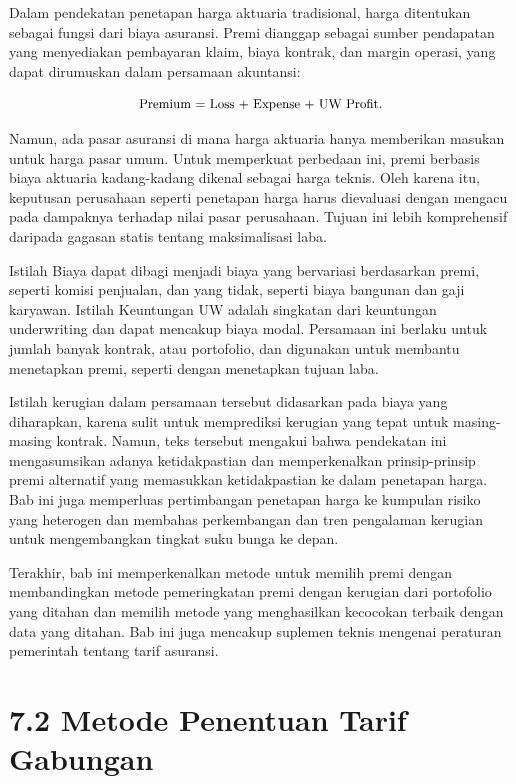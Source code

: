 \documentclass[
]{book}
\begin{document}
Dalam pendekatan penetapan harga aktuaria tradisional, harga ditentukan sebagai fungsi dari biaya asuransi. Premi dianggap sebagai sumber pendapatan yang menyediakan pembayaran klaim, biaya kontrak, dan margin operasi, yang dapat dirumuskan dalam persamaan akuntansi:

\begin{equation}
\small{
\text{Premium = Loss + Expense + UW Profit} .
}
\end{equation}

Namun, ada pasar asuransi di mana harga aktuaria hanya memberikan masukan untuk harga pasar umum. Untuk memperkuat perbedaan ini, premi berbasis biaya aktuaria kadang-kadang dikenal sebagai harga teknis. Oleh karena itu, keputusan perusahaan seperti penetapan harga harus dievaluasi dengan mengacu pada dampaknya terhadap nilai pasar perusahaan. Tujuan ini lebih komprehensif daripada gagasan statis tentang maksimalisasi laba.

Istilah Biaya dapat dibagi menjadi biaya yang bervariasi berdasarkan premi, seperti komisi penjualan, dan yang tidak, seperti biaya bangunan dan gaji karyawan. Istilah Keuntungan UW adalah singkatan dari keuntungan underwriting dan dapat mencakup biaya modal. Persamaan ini berlaku untuk jumlah banyak kontrak, atau portofolio, dan digunakan untuk membantu menetapkan premi, seperti dengan menetapkan tujuan laba.

Istilah kerugian dalam persamaan tersebut didasarkan pada biaya yang diharapkan, karena sulit untuk memprediksi kerugian yang tepat untuk masing-masing kontrak. Namun, teks tersebut mengakui bahwa pendekatan ini mengasumsikan adanya ketidakpastian dan memperkenalkan prinsip-prinsip premi alternatif yang memasukkan ketidakpastian ke dalam penetapan harga. Bab ini juga memperluas pertimbangan penetapan harga ke kumpulan risiko yang heterogen dan membahas perkembangan dan tren pengalaman kerugian untuk mengembangkan tingkat suku bunga ke depan.

Terakhir, bab ini memperkenalkan metode untuk memilih premi dengan membandingkan metode pemeringkatan premi dengan kerugian dari portofolio yang ditahan dan memilih metode yang menghasilkan kecocokan terbaik dengan data yang ditahan. Bab ini juga mencakup suplemen teknis mengenai peraturan pemerintah tentang tarif asuransi.

\hypertarget{metode-penentuan-tarif-gabungan}{%
\chapter{7.2 Metode Penentuan Tarif Gabungan}\label{metode-penentuan-tarif-gabungan}}
\end{document}
